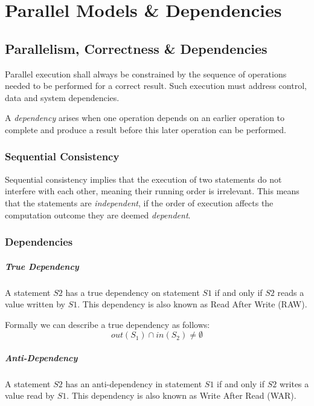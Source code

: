 \chapter{Parallel Models \& Dependencies}

\section{Parallelism, Correctness \& Dependencies}

Parallel execution shall always be constrained by the sequence of operations needed to be performed for a correct result.
Such execution must address control, data and system dependencies.

A \textit{dependency} arises when one operation depends on an earlier operation to complete and produce a result before this later operation can be performed.

\subsection{Sequential Consistency}

Sequential consistency implies that the execution of two statements do not interfere with each other, meaning their running order is irrelevant.
This means that the statements are \textit{independent},
if the order of execution affects the computation outcome they are deemed \textit{dependent}.

\subsection{Dependencies}

\paragraph{True Dependency}
A statement $S2$ has a true dependency on statement $S1$ if and only if $S2$ reads a value written by $S1$.
This dependency is also known as Read After Write (RAW).

Formally we can describe a true dependency as follows:
\begin{equation*}
    out(S_1) \cap in(S_2) \neq \emptyset
\end{equation*}

\paragraph{Anti-Dependency}
A statement $S2$ has an anti-dependency in statement $S1$ if and only if $S2$ writes a value read by $S1$.
This dependency is also known as Write After Read (WAR).

